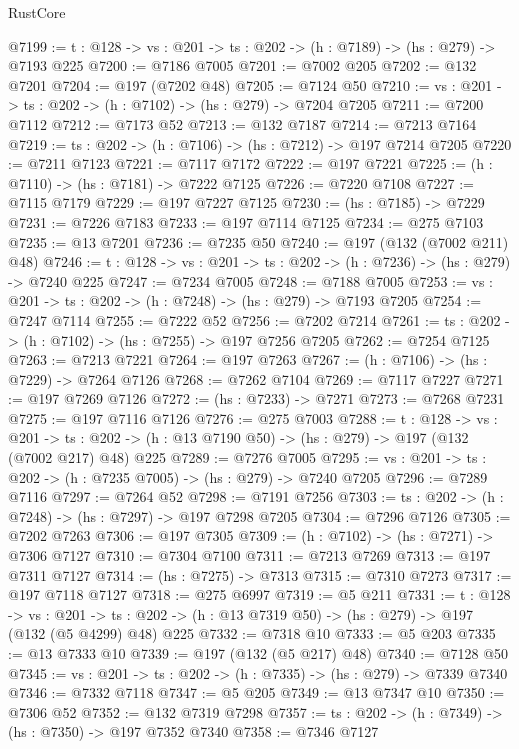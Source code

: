 \begin{lexlean}{RustCore}
\begin{coremodule}
@7199 := {t : @128} -> {vs : @201} -> {ts : @202} -> (h : @7189) -> (hs : @279) -> @7193 @225
@7200 := @7186 @7005
@7201 := @7002 @205
@7202 := @132 @7201
@7204 := @197 (@7202 @48)
@7205 := @7124 @50
@7210 := {vs : @201} -> {ts : @202} -> (h : @7102) -> (hs : @279) -> @7204 @7205
@7211 := @7200 @7112
@7212 := @7173 @52
@7213 := @132 @7187
@7214 := @7213 @7164
@7219 := {ts : @202} -> (h : @7106) -> (hs : @7212) -> @197 @7214 @7205
@7220 := @7211 @7123
@7221 := @7117 @7172
@7222 := @197 @7221
@7225 := (h : @7110) -> (hs : @7181) -> @7222 @7125
@7226 := @7220 @7108
@7227 := @7115 @7179
@7229 := @197 @7227 @7125
@7230 := (hs : @7185) -> @7229
@7231 := @7226 @7183
@7233 := @197 @7114 @7125
@7234 := @275 @7103
@7235 := @13 @7201
@7236 := @7235 @50
@7240 := @197 (@132 (@7002 @211) @48)
@7246 := {t : @128} -> {vs : @201} -> {ts : @202} -> (h : @7236) -> (hs : @279) -> @7240 @225
@7247 := @7234 @7005
@7248 := @7188 @7005
@7253 := {vs : @201} -> {ts : @202} -> (h : @7248) -> (hs : @279) -> @7193 @7205
@7254 := @7247 @7114
@7255 := @7222 @52
@7256 := @7202 @7214
@7261 := {ts : @202} -> (h : @7102) -> (hs : @7255) -> @197 @7256 @7205
@7262 := @7254 @7125
@7263 := @7213 @7221
@7264 := @197 @7263
@7267 := (h : @7106) -> (hs : @7229) -> @7264 @7126
@7268 := @7262 @7104
@7269 := @7117 @7227
@7271 := @197 @7269 @7126
@7272 := (hs : @7233) -> @7271
@7273 := @7268 @7231
@7275 := @197 @7116 @7126
@7276 := @275 @7003
@7288 := {t : @128} ->
  {vs : @201} ->
  {ts : @202} -> (h : @13 @7190 @50) -> (hs : @279) -> @197 (@132 (@7002 @217) @48) @225
@7289 := @7276 @7005
@7295 := {vs : @201} -> {ts : @202} -> (h : @7235 @7005) -> (hs : @279) -> @7240 @7205
@7296 := @7289 @7116
@7297 := @7264 @52
@7298 := @7191 @7256
@7303 := {ts : @202} -> (h : @7248) -> (hs : @7297) -> @197 @7298 @7205
@7304 := @7296 @7126
@7305 := @7202 @7263
@7306 := @197 @7305
@7309 := (h : @7102) -> (hs : @7271) -> @7306 @7127
@7310 := @7304 @7100
@7311 := @7213 @7269
@7313 := @197 @7311 @7127
@7314 := (hs : @7275) -> @7313
@7315 := @7310 @7273
@7317 := @197 @7118 @7127
@7318 := @275 @6997
@7319 := @5 @211
@7331 := {t : @128} ->
  {vs : @201} ->
  {ts : @202} -> (h : @13 @7319 @50) -> (hs : @279) -> @197 (@132 (@5 @4299) @48) @225
@7332 := @7318 @10
@7333 := @5 @203
@7335 := @13 @7333 @10
@7339 := @197 (@132 (@5 @217) @48)
@7340 := @7128 @50
@7345 := {vs : @201} -> {ts : @202} -> (h : @7335) -> (hs : @279) -> @7339 @7340
@7346 := @7332 @7118
@7347 := @5 @205
@7349 := @13 @7347 @10
@7350 := @7306 @52
@7352 := @132 @7319 @7298
@7357 := {ts : @202} -> (h : @7349) -> (hs : @7350) -> @197 @7352 @7340
@7358 := @7346 @7127

\end{coremodule}
\end{lexlean}
